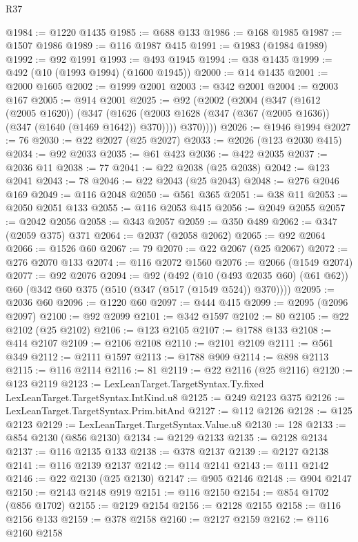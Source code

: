 \begin{lexlean}{R37}
\begin{coremodule}
@1984 := @1220 @1435
@1985 := @688 @133
@1986 := @168 @1985
@1987 := @1507 @1986
@1989 := @116 @1987 @415
@1991 := @1983 (@1984 @1989)
@1992 := @92 @1991
@1993 := @493 @1945
@1994 := @38 @1435
@1999 := @492 (@10 (@1993 @1994) (@1600 @1945))
@2000 := @14 @1435
@2001 := @2000 @1605
@2002 := @1999 @2001
@2003 := @342 @2001
@2004 := @2003 @167
@2005 := @914 @2001
@2025 := @92
    (@2002
      (@2004
        (@347
          (@1612 (@2005 @1620))
          (@347
            (@1626 (@2003 @1628 (@347 (@367 (@2005 @1636)) (@347 (@1640 (@1469 @1642)) @370))))
            @370))))
@2026 := @1946 @1994
@2027 := 76
@2030 := @22 @2027 (@25 @2027)
@2033 := @2026 (@123 @2030 @415)
@2034 := @92 @2033
@2035 := @61 @423
@2036 := @422 @2035
@2037 := @2036 @11
@2038 := 77
@2041 := @22 @2038 (@25 @2038)
@2042 := @123 @2041
@2043 := 78
@2046 := @22 @2043 (@25 @2043)
@2048 := @276 @2046 @169
@2049 := @116 @2048
@2050 := @561 @365
@2051 := @38 @11
@2053 := @2050 @2051 @133
@2055 := @116 @2053 @415
@2056 := @2049 @2055
@2057 := @2042 @2056
@2058 := @343 @2057
@2059 := @350 @489
@2062 := @347 (@2059 @375) @371
@2064 := @2037 (@2058 @2062)
@2065 := @92 @2064
@2066 := @1526 @60
@2067 := 79
@2070 := @22 @2067 (@25 @2067)
@2072 := @276 @2070 @133
@2074 := @116 @2072 @1560
@2076 := @2066 (@1549 @2074)
@2077 := @92 @2076
@2094 := @92
    (@492
      (@10 (@493 @2035 @60) (@61 @62))
      @60
      (@342 @60 @375 (@510 (@347 (@517 (@1549 @524)) @370))))
@2095 := @2036 @60
@2096 := @1220 @60
@2097 := @444 @415
@2099 := @2095 (@2096 @2097)
@2100 := @92 @2099
@2101 := @342 @1597
@2102 := 80
@2105 := @22 @2102 (@25 @2102)
@2106 := @123 @2105
@2107 := @1788 @133
@2108 := @414 @2107
@2109 := @2106 @2108
@2110 := @2101 @2109
@2111 := @561 @349
@2112 := @2111 @1597
@2113 := @1788 @909
@2114 := @898 @2113
@2115 := @116 @2114
@2116 := 81
@2119 := @22 @2116 (@25 @2116)
@2120 := @123 @2119
@2123 := LexLeanTarget.TargetSyntax.Ty.fixed LexLeanTarget.TargetSyntax.IntKind.u8
@2125 := @249 @2123 @375
@2126 := LexLeanTarget.TargetSyntax.Prim.bitAnd
@2127 := @112 @2126
@2128 := @125 @2123
@2129 := LexLeanTarget.TargetSyntax.Value.u8
@2130 := 128
@2133 := @854 @2130 (@856 @2130)
@2134 := @2129 @2133
@2135 := @2128 @2134
@2137 := @116 @2135 @133
@2138 := @378 @2137
@2139 := @2127 @2138
@2141 := @116 @2139 @2137
@2142 := @114 @2141
@2143 := @111 @2142
@2146 := @22 @2130 (@25 @2130)
@2147 := @905 @2146
@2148 := @904 @2147
@2150 := @2143 @2148 @919
@2151 := @116 @2150
@2154 := @854 @1702 (@856 @1702)
@2155 := @2129 @2154
@2156 := @2128 @2155
@2158 := @116 @2156 @133
@2159 := @378 @2158
@2160 := @2127 @2159
@2162 := @116 @2160 @2158

\end{coremodule}
\end{lexlean}

